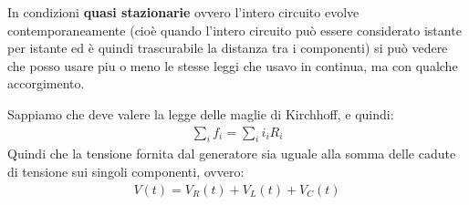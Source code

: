 \documentclass[a4paper, oneside]{article}
\begin{document}
In condizioni \textbf{quasi stazionarie} ovvero l'intero circuito evolve contemporaneamente (cioè quando l'intero circuito può essere considerato istante per istante ed è quindi trascurabile la distanza tra i componenti) si può vedere che posso usare piu o meno le stesse leggi che usavo in continua, ma con qualche accorgimento.\\
\begin{center}
\end{center}
Sappiamo che deve valere la legge delle maglie di Kirchhoff, e quindi:
\begin{gather*}
    \sum_i f_i = \sum_i i_i R_i
\end{gather*}
Quindi che la tensione fornita dal generatore sia uguale alla somma delle cadute di tensione sui singoli componenti, ovvero:
\begin{gather*}
    V(t) = V_R(t) + V_L(t) + V_C(t)
\end{gather*}
\end{document}
